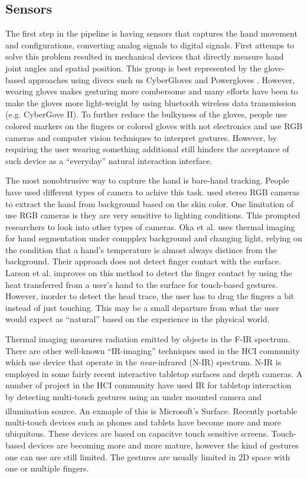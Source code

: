 \subsection{Sensors}
The first step in the pipeline is having sensors that captures the hand movement
and configurations, converting analog signals to digital signals. First attemps
to solve this problem resulted in mechanical devices that directly measure hand
joint angles and spatial position. This group is best represented by the
glove-based approaches using divecs such us CyberGloves \cite{fels09} and
Powergloves \cite{kadous02}. However, wearing gloves makes gesturing more
combersome and many efforts have been to make the gloves more light-weight by
using bluetooth wireless data transmission (e.g. CyberGove II). To further
reduce the bulkyness of the gloves, people use colored markers on the fingers
\cite{mistry09} or colored gloves with not electronics \cite{Wang09} and use RGB
cameras and computer vision techniques to interpret gestures. However, by
requiring the user wearing something additional still hinders the acceptance of
such device as a ``everyday'' natural interaction interface. 

The most nonobtrusive way to capture the hand is bare-hand tracking. People have
used different types of camera to achive this task. \cite{Shin04} used stereo RGB
cameras to extract the hand from background based on the skin color. One
limitation of use RGB cameras is they are very sensitive to lighting conditions.
This prompted researchers to look into other types of cameras. Oka et al. 
\cite{Oka02} uses thermal imaging for hand segmentation under compplex
background and changing light, relying on the condition that a hand's
temperature is almost always distince from the background. Their approach does
not detect finger contact with the surface. Larson et al. \cite{larson11}
improves on this method to detect the finger contact by using
the heat transferred from a user's hand to the surface for touch-based gestures.
However, inorder to detect the head trace, the user has to drag the fingers a
bit instead of just touching. This may be a small departure from what the user
would expect as ``natural'' based on the experience in the physical world.

Thermal imaging measures radiation emitted by objects in the F-IR spectrum.
There are other well-known ``IR-imaging'' techniques used in the HCI community
which use device that operate in the \textit{near}-infrared (N-IR) spectrum.
N-IR is employed in some fairly recent interactive tabletop surfaces and depth
cameras. A number of project in the HCI community have used IR for tabletop
interaction by detecting multi-touch gestures using an under mounted
camera and illumination source. An exmaple of this is Microsoft's 
Surface\textsuperscript{\textregistered}. Recently portable multi-touch devices
such as phones and tablets have become more and more ubiquitous. These devices
are based on capacitve touch sensitive screens. Touch-based devices are becoming
more and more mature, however the kind of gestures one can use are still
limited. The gestures are usually limited in 2D space with one or multiple
fingers. 

